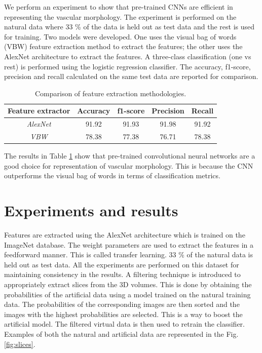 We perform an experiment to show that pre-trained CNNs are efficient in representing the vascular morphology. The experiment is performed on the natural data where 33 \% of the data is held out as test data and the rest is used for training. Two models were developed. One uses the visual bag of words (VBW) \cite{yang2007evaluating} feature extraction method to extract the features; the other uses the AlexNet architecture to extract the features. A three-class classification (one vs rest) is performed using the logistic regression classifier. The accuracy, f1-score, precision and recall calculated on the same test data are reported for comparison.

\begin{table}[ht!]
\centering
\caption{Comparison of feature extraction methodologies.}
\begin{tabular}{ | c | c | c | c | c |} 
\hline
Feature extractor  & Accuracy	& f1-score	 & Precision & Recall \\ 
\hline
\textit{AlexNet} & 91.92 & 91.93 & 91.98 & 91.92 \\ 
\hline
\textit{VBW} & 78.38	& 77.38 & 	76.71 & 78.38 \\
\hline
\end{tabular}
\label{table:FE}
\end{table}

The results in Table \ref{table:FE} show that pre-trained convolutional neural networks are a good choice for representation of vascular morphology. This is because the CNN outperforms the visual bag of words in terms of classification metrics.

\section{Experiments and results}
Features are extracted using the AlexNet architecture which is trained on the ImageNet \cite{deng2009imagenet} database. The weight parameters are used to extract the features in a feedforward manner. This is called transfer learning. 33 \% of the natural data is held out as test data. All the experiments are performed on this dataset for maintaining consistency in the results. 
A filtering technique is introduced to appropriately extract slices from the 3D volumes. This is done by obtaining the probabilities of the artificial data using a model trained on the natural training data. The probabilities of the corresponding images are then sorted and the images with the highest probabilities are selected. This is a way to boost the artificial model.  The filtered virtual data is then used to retrain the classifier. Examples of both the natural and artificial data are represented in the Fig. \ref{fig:slices}.

